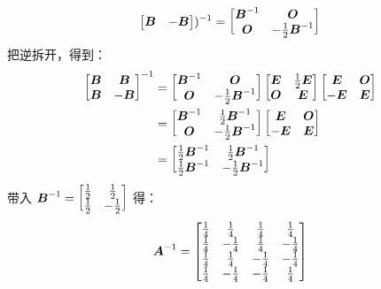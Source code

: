 \begin{problem}
\begin{solution}
\begin{itemize}
$$\begin{bmatrix}
				\boldsymbol{B} & -\boldsymbol{B}
			\end{bmatrix})^{-1} = \begin{bmatrix}
				\boldsymbol{B}^{-1} & \boldsymbol{O} \\
				\boldsymbol{O} & -\frac{1}{2} \boldsymbol{B}^{-1}
			\end{bmatrix}
			$$
			把逆拆开，得到：
			$$
			\begin{aligned}
				\begin{bmatrix}
					\boldsymbol{B} & \boldsymbol{B} \\
					\boldsymbol{B} & -\boldsymbol{B}
				\end{bmatrix}^{-1} & = \begin{bmatrix}
					\boldsymbol{B}^{-1} & \boldsymbol{O} \\
					\boldsymbol{O} & -\frac{1}{2} \boldsymbol{B}^{-1}
				\end{bmatrix}
				\begin{bmatrix}
					\boldsymbol{E} & \frac{1}{2} \boldsymbol{E} \\
					\boldsymbol{O} & \boldsymbol{E}
				\end{bmatrix}
				\begin{bmatrix}
					\boldsymbol{E} & \boldsymbol{O} \\
					-\boldsymbol{E} & \boldsymbol{E}
				\end{bmatrix} \\
				& = \begin{bmatrix}
					\boldsymbol{B}^{-1} & \frac{1}{2} \boldsymbol{B}^{-1} \\
					\boldsymbol{O} & -\frac{1}{2} \boldsymbol{B}^{-1}
				\end{bmatrix}
				\begin{bmatrix}
					\boldsymbol{E} & \boldsymbol{O} \\
					-\boldsymbol{E} & \boldsymbol{E}
				\end{bmatrix} \\
				& = \begin{bmatrix}
					\frac{1}{2} \boldsymbol{B}^{-1} & \frac{1}{2} \boldsymbol{B}^{-1} \\
					\frac{1}{2} \boldsymbol{B}^{-1} & -\frac{1}{2} \boldsymbol{B}^{-1}
				\end{bmatrix}
			\end{aligned}
			$$
			带入 $\boldsymbol{B}^{-1} = \begin{bmatrix} \frac{1}{2} & \frac{1}{2} \\ \frac{1}{2} & -\frac{1}{2} \end{bmatrix}$ 得：
			$$
			\boldsymbol{A}^{-1} = \begin{bmatrix}
				\frac{1}{4} & \frac{1}{4} & \frac{1}{4} & \frac{1}{4} \\
				\frac{1}{4} & -\frac{1}{4} & \frac{1}{4} & -\frac{1}{4} \\
				\frac{1}{4} & \frac{1}{4} & -\frac{1}{4} & -\frac{1}{4} \\
				\frac{1}{4} & -\frac{1}{4} & -\frac{1}{4} & \frac{1}{4}
			\end{bmatrix}
			$$
		\end{itemize}
	\end{solution}
\end{problem}